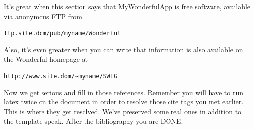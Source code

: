 \documentclass[letterpaper,twocolumn,10pt]{article}
\begin{document}
It's great when this section says that MyWonderfulApp is free software, 
available via anonymous FTP from

\begin{center}
{\tt ftp.site.dom/pub/myname/Wonderful}\\
\end{center}

Also, it's even greater when you can write that information is also 
available on the Wonderful homepage at 

\begin{center}
{\tt http://www.site.dom/\~{}myname/SWIG}
\end{center}

Now we get serious and fill in those references.  Remember you will
have to run latex twice on the document in order to resolve those
cite tags you met earlier.  This is where they get resolved.
We've preserved some real ones in addition to the template-speak.
After the bibliography you are DONE.

{\footnotesize 
}


\theendnotes
\end{document}
